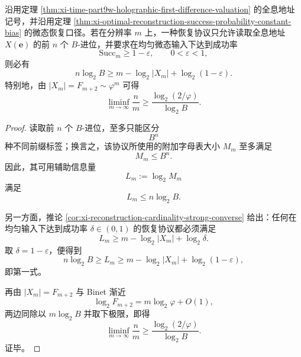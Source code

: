 \begin{corollary}\label{cor:xi-time-part9w-prefix-recovery-minimal-rate}
沿用定理 \ref{thm:xi-time-part9w-holographic-first-difference-valuation} 的全息地址记号，并沿用定理 \ref{thm:xi-optimal-reconstruction-success-probability-constant-bias} 的微态恢复口径。若在分辨率 \(m\) 上，一种恢复协议只允许读取全息地址 \(X(\mathbf e)\) 的前 \(n\) 个 \(B\)-进位，并要求在均匀微态输入下达到成功率
\[
\mathrm{Succ}_m\ge 1-\varepsilon,
\qquad
0<\varepsilon<1,
\]
则必有
\[
n\log_2 B
\ge
m-\log_2|X_m|+\log_2(1-\varepsilon).
\]
特别地，由 \(|X_m|=F_{m+2}\sim \varphi^m\) 可得
\[
\liminf_{m\to\infty}\frac{n}{m}
\ge
\frac{\log_2(2/\varphi)}{\log_2 B}.
\]
\end{corollary}
\begin{proof}
读取前 \(n\) 个 \(B\)-进位，至多只能区分
\[
B^n
\]
种不同前缀标签；换言之，该协议所使用的附加字母表大小 \(M_m\) 至多满足
\[
M_m\le B^n.
\]
因此，其可用辅助信息量
\[
L_m:=\log_2 M_m
\]
满足
\[
L_m\le n\log_2 B.
\]

另一方面，推论 \ref{cor:xi-reconstruction-cardinality-strong-converse} 给出：任何在均匀输入下达到成功率 \(\delta\in(0,1)\) 的恢复协议都必须满足
\[
L_m\ge m-\log_2|X_m|+\log_2\delta.
\]
取 \(\delta=1-\varepsilon\)，便得到
\[
n\log_2 B
\ge
L_m
\ge
m-\log_2|X_m|+\log_2(1-\varepsilon),
\]
即第一式。

再由 \(|X_m|=F_{m+2}\) 与 Binet 渐近
\[
\log_2 F_{m+2}=m\log_2\varphi+O(1),
\]
两边同除以 \(m\log_2 B\) 并取下极限，即得
\[
\liminf_{m\to\infty}\frac{n}{m}
\ge
\frac{\log_2(2/\varphi)}{\log_2 B}.
\]
证毕。
\end{proof}

